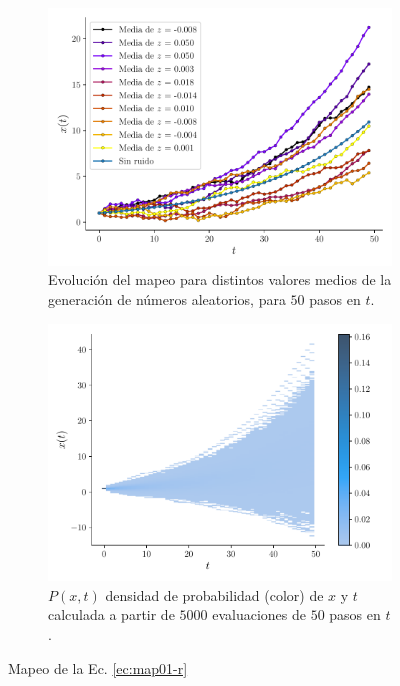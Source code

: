 \documentclass[twocolumn,aps,prl]{revtex4-1}
\newcommand{\nSimulacionesB}{5000}
\newcommand{\Nsteps}{50}
\begin{document}
\begin{figure}[ht!]
  \centering
  \begin{subfigure}[b]{0.49\linewidth}
      \centering
      \includegraphics[width = 0.999\textwidth]{figuras/ex02-mapeo.pdf}
      \caption{Evolución del mapeo para distintos valores medios de la generación de números aleatorios, para $\Nsteps$ pasos en $t$.}
      \label{fig:figuras/ex02-mapeo}
  \end{subfigure}
  \begin{subfigure}[b]{0.49\linewidth}
      \centering
      \includegraphics[width = 0.999\textwidth]{figuras/ex02-histograma.pdf}
      \caption{$P(x,t)$ densidad de probabilidad (color) de $x$ y $t$ calculada a partir de $\nSimulacionesB$ evaluaciones de $\Nsteps$ pasos en $t$.}
      \label{fig:figuras/ex02-histograma}
  \end{subfigure}
  \caption{Mapeo de la Ec. \ref{ec:map01-r}}
  \label{fig:figuras/ex02-0}
\end{figure}
\end{document}
